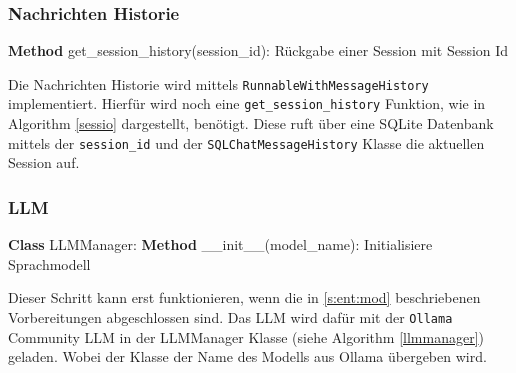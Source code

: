\subsubsection{Nachrichten Historie}
\begin{algorithm}
    \caption{Nachrichten Historie}
    \begin{algorithmic}[1]
        
    \STATE \textbf{Method} get\_session\_history(session\_id):
    \STATE \quad Rückgabe einer Session mit Session Id 
    \end{algorithmic}
    \label{sessio}
\end{algorithm}
Die Nachrichten Historie wird mittels \verb|RunnableWithMessageHistory| 
implementiert. Hierfür wird noch eine \verb|get_session_history| Funktion, wie in Algorithm \ref{sessio} dargestellt, benötigt.
Diese ruft über eine SQLite Datenbank mittels der \verb|session_id| und der \verb|SQLChatMessageHistory| Klasse die aktuellen Session
auf. 

\subsubsection{LLM}
\label{entllm}
\begin{algorithm}
    \caption{LLM-Manager}
    \begin{algorithmic}[1]
    \STATE \textbf{Class} LLMManager:
    \STATE \textbf{Method} \_\_init\_\_(model\_name):
    \STATE \quad Initialisiere Sprachmodell 
    \end{algorithmic}
    \label{llmmanager}
    \end{algorithm}
Dieser Schritt kann erst funktionieren, wenn die in 
\ref*{s:ent:mod} beschriebenen Vorbereitungen abgeschlossen sind. 
Das LLM wird dafür mit der \verb|Ollama| Community LLM in der LLMManager Klasse (siehe Algorithm \ref*{llmmanager}) geladen. Wobei 
der Klasse der Name des Modells aus Ollama übergeben wird. \par


